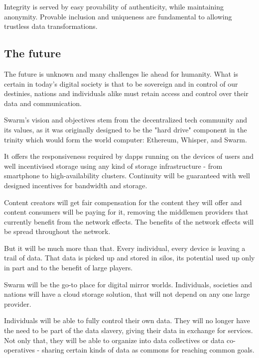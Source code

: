 Integrity is served by easy provability of authenticity, while maintaining anonymity.
Provable inclusion and uniqueness are fundamental to allowing trustless data transformations.


\subsection{The future} \label{sec:future}

The future is unknown and many challenges lie ahead for humanity. What is certain in today's digital society is that to be sovereign and in control of our destinies, nations and individuals alike must retain access and control over their data and communication.

Swarm's vision and objectives stem from the decentralized tech community and its values, as it was originally designed to be the "hard drive" component in the trinity which would form the world computer: Ethereum, Whisper, and Swarm.

It offers the responsiveness required by dapps running on the devices of users and well incentivised storage using any kind of storage infrastructure - from smartphone to high-availability clusters. Continuity will be guaranteed with well designed incentives for bandwidth and storage.

Content creators will get fair compensation for the content they will offer and content consumers will be paying for it, removing the middlemen providers that currently benefit from the network effects. The benefits of the network effects will be spread throughout the network.

But it will be much more than that. Every individual, every device is leaving a trail of data. That data is picked up and stored in silos, its potential used up only in part and to the benefit of large players.

Swarm will be the go-to place for digital mirror worlds. Individuals, societies and nations will have a cloud storage solution, that will not depend on any one large provider. 


Individuals will be able to fully control their own data. They will no longer have the need to be part of the data slavery, giving their data in exchange for services. Not only that, they will be able to organize into data collectives or data co-operatives - sharing certain kinds of data as commons for reaching common goals. 

